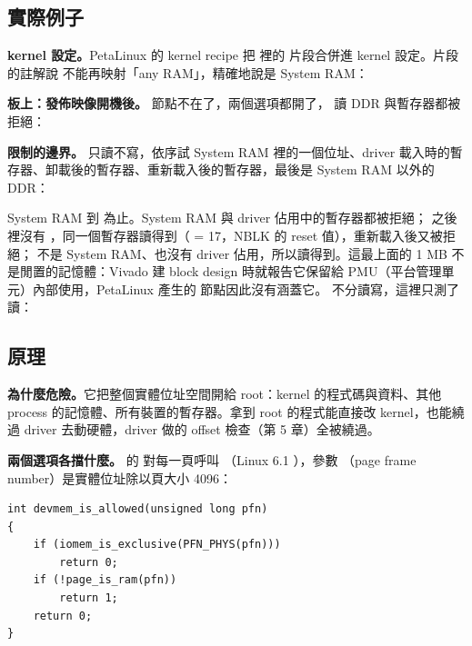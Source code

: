 \subsection{實際例子}

\textbf{kernel 設定。}PetaLinux 的 kernel recipe 把  裡的  片段合併進 kernel 設定。片段的註解說  不能再映射「any RAM」，精確地說是 System RAM：


\textbf{板上：發佈映像開機後。} 節點不在了，兩個選項都開了， 讀 DDR 與暫存器都被拒絕：


\textbf{限制的邊界。} 只讀不寫，依序試 System RAM 裡的一個位址、driver 載入時的暫存器、卸載後的暫存器、重新載入後的暫存器，最後是 System RAM 以外的 DDR：


System RAM 到  為止。System RAM 與 driver 佔用中的暫存器都被拒絕； 之後  裡沒有 ，同一個暫存器讀得到（ = 17，NBLK 的 reset 值），重新載入後又被拒絕； 不是 System RAM、也沒有 driver 佔用，所以讀得到。這最上面的 1 MB 不是閒置的記憶體：Vivado 建 block design 時就報告它保留給 PMU（平台管理單元）內部使用，PetaLinux 產生的  節點因此沒有涵蓋它。 不分讀寫，這裡只測了讀：


\subsection{原理}

\textbf{ 為什麼危險。}它把整個實體位址空間開給 root：kernel 的程式碼與資料、其他 process 的記憶體、所有裝置的暫存器。拿到 root 的程式能直接改 kernel，也能繞過 driver 去動硬體，driver 做的 offset 檢查（第 5 章）全被繞過。

\textbf{兩個選項各擋什麼。} 的  對每一頁呼叫 （Linux 6.1 ），參數 （page frame number）是實體位址除以頁大小 4096：

\nopagebreak
\begin{lstlisting}[numbers=none,xleftmargin=0pt,title={\scriptsize lib/devmem\_is\_allowed.c（Linux 6.1，節錄）}]
int devmem_is_allowed(unsigned long pfn)
{
	if (iomem_is_exclusive(PFN_PHYS(pfn)))
		return 0;
	if (!page_is_ram(pfn))
		return 1;
	return 0;
}
\end{lstlisting}

